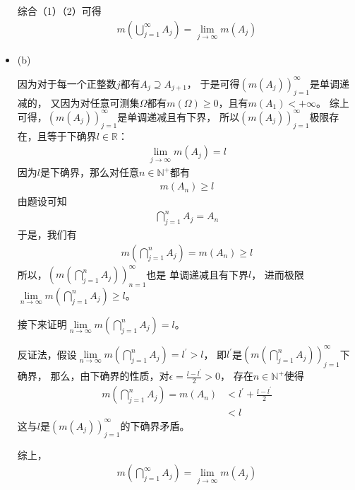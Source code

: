 \documentclass{article}
\begin{document}
\begin{itemize}
        综合（1）（2）可得
        \begin{align*}
          m(\bigcup\limits_{j = 1}^\infty A_j) = \lim\limits_{j \to \infty} m(A_j)
        \end{align*}

  \item (b)

        因为对于每一个正整数$j$都有$A_j \supseteq A_{j + 1}$，
        于是可得$(m(A_j))_{j = 1}^\infty$是单调递减的，
        又因为对任意可测集$\Omega$都有$m(\Omega) \geq 0$，且有$m(A_1) < +\infty$。
        综上可得，$(m(A_j))_{j = 1}^\infty$是单调递减且有下界，
        所以$(m(A_j))_{j = 1}^\infty$极限存在，且等于下确界$l \in \mathbb{R}$：
        \begin{align*}
          \lim\limits_{j \to \infty} m(A_j) = l
        \end{align*}
        因为$l$是下确界，那么对任意$n \in \mathbb{N}^+$都有
        \begin{align*}
          m(A_n) \geq l
        \end{align*}
        由题设可知
        \begin{align*}
          \bigcap\limits_{j = 1}^n A_j = A_n
        \end{align*}
        于是，我们有
        \begin{align*}
          m(\bigcap\limits_{j = 1}^n A_j) = m(A_n) \geq l
        \end{align*}
        所以，$(m(\bigcap\limits_{j = 1}^n A_j))_{n = 1}^\infty$也是
        单调递减且有下界$l$，
        进而极限$\lim\limits_{n \to \infty} m(\bigcap\limits_{j = 1}^n A_j) \geq l$。

        接下来证明$\lim\limits_{n \to \infty} m(\bigcap\limits_{j = 1}^n A_j) = l$。

        反证法，假设$\lim\limits_{n \to \infty} m(\bigcap\limits_{j = 1}^n A_j) = l^\prime > l $，
        即$l^\prime$是$(m(\bigcap\limits_{j = 1}^n A_j))_{j = 1}^\infty$下确界，
        那么，由下确界的性质，对$\epsilon = \frac{l - l^\prime}{2} > 0$，
        存在$n \in \mathbb{N}^+$使得
        \begin{align*}
          m(\bigcap\limits_{j = 1}^n A_j) = m(A_n) & < l^\prime + \frac{l - l^\prime}{2} \\
                                                   & < l
        \end{align*}
        这与$l$是$(m(A_j))_{j = 1}^\infty$的下确界矛盾。

        综上，
        \begin{align*}
          m(\bigcap\limits_{j = 1}^\infty A_j) = \lim\limits_{j \to \infty} m(A_j)
        \end{align*}
\end{itemize}
\end{document}
